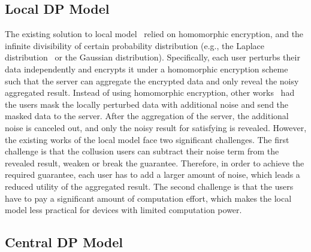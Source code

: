 \subsection{Local DP Model}
\label{subsec:LocallDPModel}
The existing solution to local \differentialprivacy model~\cite{rastogi2010differentially,Elaine2011Privacy,acs2011have, chan2012privacy,bindschaedler2017achieving,shi2017distributed,truex2019hybrid} relied on homomorphic encryption, \smpc and the infinite divisibility of certain probability distribution (e.g., the Laplace distribution~\cite{kotz2001laplace} or the Gaussian distribution). Specifically, each user perturbs their data independently and encrypts it under a homomorphic encryption scheme such that the server can aggregate the encrypted data and only reveal the noisy aggregated result.
Instead of using homomorphic encryption, other works~\cite{byrd2020differentially,balle2020private,ghazi2021differentially} had the users mask the locally perturbed data with additional noise and send the masked data to the server. After the aggregation of the server, the additional noise is canceled out, and only the noisy result for satisfying \differentialprivacy is revealed.
However, the existing works of the local \differentialprivacy model face two significant challenges. The first challenge is that the collusion users can subtract their noise term from the revealed result, weaken or break the \differentialprivacy guarantee. Therefore, in order to achieve the required \differentialprivacy guarantee, each user has to add a larger amount of noise, which leads a reduced utility of the aggregated result.
The second challenge is that the users have to pay a significant amount of computation effort, which makes the local \differentialprivacy model less practical for devices with limited computation power.


\subsection{Central DP Model}
\label{subsec:CentralDPModel}

